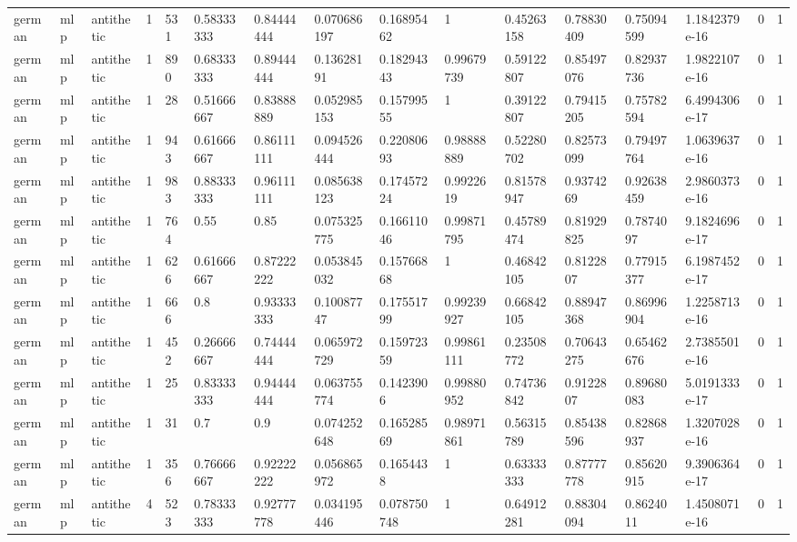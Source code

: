 \begin{tabular}{llllllllllllllll}
german & mlp & antithetic & 1 & 531 & 0.58333333 & 0.84444444 & 0.070686197 & 0.16895462 & 1 & 0.45263158 & 0.78830409 & 0.75094599 & 1.1842379e-16 & 0 & 1 \\
german & mlp & antithetic & 1 & 890 & 0.68333333 & 0.89444444 & 0.13628191 & 0.18294343 & 0.99679739 & 0.59122807 & 0.85497076 & 0.82937736 & 1.9822107e-16 & 0 & 1 \\
german & mlp & antithetic & 1 & 28 & 0.51666667 & 0.83888889 & 0.052985153 & 0.15799555 & 1 & 0.39122807 & 0.79415205 & 0.75782594 & 6.4994306e-17 & 0 & 1 \\
german & mlp & antithetic & 1 & 943 & 0.61666667 & 0.86111111 & 0.094526444 & 0.22080693 & 0.98888889 & 0.52280702 & 0.82573099 & 0.79497764 & 1.0639637e-16 & 0 & 1 \\
german & mlp & antithetic & 1 & 983 & 0.88333333 & 0.96111111 & 0.085638123 & 0.17457224 & 0.9922619 & 0.81578947 & 0.9374269 & 0.92638459 & 2.9860373e-16 & 0 & 1 \\
german & mlp & antithetic & 1 & 764 & 0.55 & 0.85 & 0.075325775 & 0.16611046 & 0.99871795 & 0.45789474 & 0.81929825 & 0.7874097 & 9.1824696e-17 & 0 & 1 \\
german & mlp & antithetic & 1 & 626 & 0.61666667 & 0.87222222 & 0.053845032 & 0.15766868 & 1 & 0.46842105 & 0.8122807 & 0.77915377 & 6.1987452e-17 & 0 & 1 \\
german & mlp & antithetic & 1 & 666 & 0.8 & 0.93333333 & 0.10087747 & 0.17551799 & 0.99239927 & 0.66842105 & 0.88947368 & 0.86996904 & 1.2258713e-16 & 0 & 1 \\
german & mlp & antithetic & 1 & 452 & 0.26666667 & 0.74444444 & 0.065972729 & 0.15972359 & 0.99861111 & 0.23508772 & 0.70643275 & 0.65462676 & 2.7385501e-16 & 0 & 1 \\
german & mlp & antithetic & 1 & 25 & 0.83333333 & 0.94444444 & 0.063755774 & 0.1423906 & 0.99880952 & 0.74736842 & 0.9122807 & 0.89680083 & 5.0191333e-17 & 0 & 1 \\
german & mlp & antithetic & 1 & 31 & 0.7 & 0.9 & 0.074252648 & 0.16528569 & 0.98971861 & 0.56315789 & 0.85438596 & 0.82868937 & 1.3207028e-16 & 0 & 1 \\
german & mlp & antithetic & 1 & 356 & 0.76666667 & 0.92222222 & 0.056865972 & 0.1654438 & 1 & 0.63333333 & 0.87777778 & 0.85620915 & 9.3906364e-17 & 0 & 1 \\
german & mlp & antithetic & 4 & 523 & 0.78333333 & 0.92777778 & 0.034195446 & 0.078750748 & 1 & 0.64912281 & 0.88304094 & 0.8624011 & 1.4508071e-16 & 0 & 1 \\

\end{tabular}
